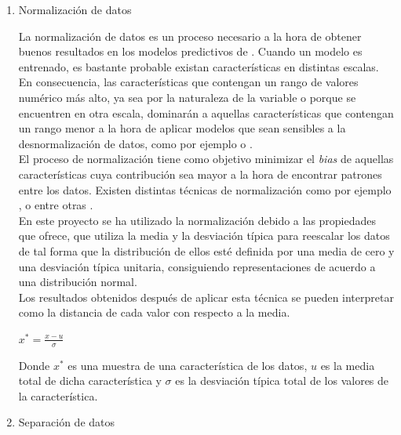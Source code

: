 \begin{enumerate}
\begin{enumerate}
                \item Normalización de datos


                    La normalización de datos es un proceso necesario a la hora de obtener buenos resultados en los modelos predictivos de . Cuando un modelo es entrenado, es bastante probable existan características en distintas escalas. En consecuencia, las características que contengan un rango de valores numérico más alto, ya sea por la naturaleza de la variable o porque se encuentren en otra escala, dominarán a aquellas características que contengan un rango menor a la hora de aplicar modelos  que sean sensibles a la desnormalización de datos, como por ejemplo  o  \cite{NormalizationSensitiveModels}.\\


                    El proceso de normalización tiene como objetivo minimizar el \textit{bias} de aquellas características cuya contribución sea mayor a la hora de encontrar patrones entre los datos. Existen distintas técnicas de normalización como por ejemplo ,  o  entre otras \cite{DataNormalizationInvestigation}.\\


                    En este proyecto se ha utilizado la normalización  debido a las propiedades que ofrece,  que utiliza la media y la desviación típica para reescalar los datos de tal forma que la distribución de ellos esté definida por una media de cero y una desviación típica unitaria, consiguiendo representaciones de acuerdo a una distribución normal.\\

                    Los resultados obtenidos después de aplicar esta técnica se pueden interpretar como la distancia de cada valor con respecto a la media.

                   \begin{center}
                        $x^* = \frac{x - u}{\sigma}$
                    \end{center}


                    Donde $x^*$ es una muestra de una característica de los datos, $u$ es la media total de dicha característica y $\sigma$ es la desviación típica total de los valores de la característica.


                \item Separación de datos


\end{enumerate}
\end{enumerate}
